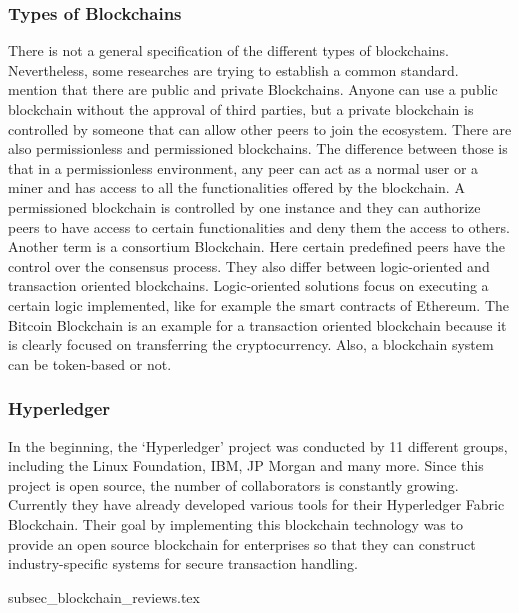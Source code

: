 
\subsubsection{Types of Blockchains}
There is not a general specification of the different types of blockchains. Nevertheless, some researches are trying to establish a common standard. \cite{2018_Fernandez} mention that there are public and private Blockchains. Anyone can use a public blockchain without the approval of third parties, but a private blockchain is controlled by someone that can allow other peers to join the ecosystem. There are also permissionless and permissioned blockchains. The difference between those is that in a permissionless environment, any peer can act as a normal user or a miner and has access to all the functionalities offered by the blockchain. A permissioned blockchain is controlled by one instance and they can authorize peers to have access to certain functionalities and deny them the access to others. Another term is a consortium Blockchain. Here certain predefined peers have the control over the consensus process. \cite{2018_Meinel}
They also differ between logic-oriented and transaction oriented blockchains. Logic-oriented solutions focus on executing a certain logic implemented, like for example the smart contracts of Ethereum. The Bitcoin Blockchain is an example for a transaction oriented blockchain because it is clearly focused on transferring the cryptocurrency. Also, a blockchain system can be token-based or not.


\subsubsection{Hyperledger}
In the beginning, the ‘Hyperledger’ project was conducted by 11 different groups, including the Linux Foundation, IBM, JP Morgan and many more. Since this project is open source, the number of collaborators is constantly growing. Currently they have already developed various tools for their Hyperledger Fabric Blockchain. Their goal by implementing this blockchain technology was to provide an open source blockchain for enterprises so that they can construct industry-specific systems for secure transaction handling.


\clearpage
{subsec_blockchain_reviews.tex}